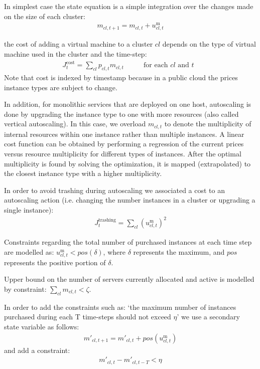   In simplest case the state equation is a simple integration over the changes made on the size of each cluster:
   \begin{align}
    m_{cl,t+1} = m_{cl,t} + u^\text{m}_{cl,t} \label{eq:reservation-dynamics}
  \end{align}

the cost of adding a virtual machine  to a cluster $cl$  depends on the type of virtual machine used in the cluster and the time-step: 
 \begin{align}
   J^\text{cost}_t=\sum_{cl} p_{cl,t} m_{cl,t}  & \qquad \text{for each $cl$ and $t$  }
 \end{align}
 Note that cost is indexed by  timestamp because in a public cloud the prices instance types are subject to change.  
 
   In addition, for monolithic services that are deployed on one host, autoscaling is done by upgrading the instance type to one with more resources (also called vertical autoscaling). In this case, we overload $m_{{cl},t}$  to denote the multiplicity of internal resources within one instance rather than multiple instances. A linear cost function can be obtained by performing a regression of the current prices versus resource multiplicity for different types of instances. After the optimal multiplicity is found by solving the optimization, it is mapped (extrapolated) to the closest instance type with a higher multiplicity.
 
  In order to avoid trashing during autoscaling we associated a cost to an autoscaling action (i.e. changing the number instances in a cluster or upgrading a single instance): 
   \begin{align}
   J^\text{trashing}_t=\sum_{cl} (u^\text{m}_{cl,t})^2
 \end{align}
 
  Constraints regarding the total number of purchased instances at each time step are modelled as: $u^\text{m}_{{cl},t}<pos(\delta)$, where $\delta$  represents the maximum, and $pos$  represents the positive  portion of $\delta$.
    
    Upper bound on the number of servers currently allocated and active is modelled by constraint: $\sum_{cl} m_{{cl},t}<\zeta$. 

  In order to add the constraints such as: 
  `the maximum number of instances purchased during each T time-steps should not exceed $\eta$'  we use a  secondary state variable as follows: 
  \begin{align}
    m'_{cl,t+1} = m'_{cl,t} + pos(u^\text{m}_{cl,t}) \label{eq:extra-dynamics}
  \end{align}
   and add a constraint: 
   \begin{align}\label{eq:extra-constraints}
    m'_{cl,t} - m'_{cl,t-T} < \eta  %
  \end{align}
  
